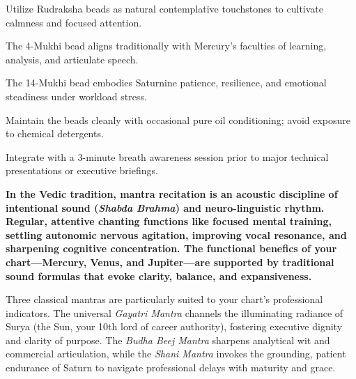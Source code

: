 \begin{diamondlist}
  \item {\fontsize{8.5}{12}\selectfont Utilize Rudraksha beads as natural contemplative touchstones to cultivate calmness and focused attention.}
  \item {\fontsize{8.5}{12}\selectfont The 4-Mukhi bead aligns traditionally with Mercury's faculties of learning, analysis, and articulate speech.}
  \item {\fontsize{8.5}{12}\selectfont The 14-Mukhi bead embodies Saturnine patience, resilience, and emotional steadiness under workload stress.}
  \item {\fontsize{8.5}{12}\selectfont Maintain the beads cleanly with occasional pure oil conditioning; avoid exposure to chemical detergents.}
  \item {\fontsize{8.5}{12}\selectfont Integrate with a 3-minute breath awareness session prior to major technical presentations or executive briefings.}
\end{diamondlist}


\label{topic61}

{\fontsize{9.5}{13.8}\selectfont\bfseries\color{DeepSlate} In the Vedic tradition, mantra recitation is an acoustic discipline of intentional sound (\textit{Shabda Brahma}) and neuro-linguistic rhythm. Regular, attentive chanting functions like focused mental training, settling autonomic nervous agitation, improving vocal resonance, and sharpening cognitive concentration. The functional benefics of your chart---Mercury, Venus, and Jupiter---are supported by traditional sound formulas that evoke clarity, balance, and expansiveness.}\par\vspace{2mm}

{\fontsize{9}{13}\selectfont Three classical mantras are particularly suited to your chart's professional indicators. The universal \textit{Gayatri Mantra} channels the illuminating radiance of Surya (the Sun, your 10th lord of career authority), fostering executive dignity and clarity of purpose. The \textit{Budha Beej Mantra} sharpens analytical wit and commercial articulation, while the \textit{Shani Mantra} invokes the grounding, patient endurance of Saturn to navigate professional delays with maturity and grace.}\par\vspace{1.8mm}

